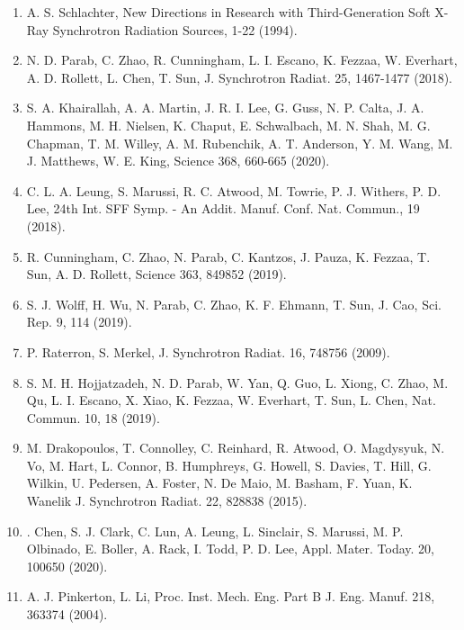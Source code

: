 \documentclass[10pt]{article}
\begin{document}
\begin{enumerate}
  \item A. S. Schlachter, New Directions in Research with Third-Generation Soft X-Ray Synchrotron Radiation Sources, 1-22 (1994).

  \item N. D. Parab, C. Zhao, R. Cunningham, L. I. Escano, K. Fezzaa, W. Everhart, A. D. Rollett, L. Chen, T. Sun, J. Synchrotron Radiat. 25, 1467-1477 (2018).

  \item S. A. Khairallah, A. A. Martin, J. R. I. Lee, G. Guss, N. P. Calta, J. A. Hammons, M. H. Nielsen, K. Chaput, E. Schwalbach, M. N. Shah, M. G. Chapman, T. M. Willey, A. M. Rubenchik, A. T. Anderson, Y. M. Wang, M. J. Matthews, W. E. King, Science 368, 660-665 (2020).

  \item C. L. A. Leung, S. Marussi, R. C. Atwood, M. Towrie, P. J. Withers, P. D. Lee, 24th Int. SFF Symp. - An Addit. Manuf. Conf. Nat. Commun., 19 (2018).

  \item R. Cunningham, C. Zhao, N. Parab, C. Kantzos, J. Pauza, K. Fezzaa, T. Sun, A. D. Rollett, Science 363, 849852 (2019).

  \item S. J. Wolff, H. Wu, N. Parab, C. Zhao, K. F. Ehmann, T. Sun, J. Cao, Sci. Rep. 9, 114 (2019).

  \item P. Raterron, S. Merkel, J. Synchrotron Radiat. 16, 748756 (2009).

  \item S. M. H. Hojjatzadeh, N. D. Parab, W. Yan, Q. Guo, L. Xiong, C. Zhao, M. Qu, L. I. Escano, X. Xiao, K. Fezzaa, W. Everhart, T. Sun, L. Chen, Nat. Commun. 10, 18 (2019).

  \item M. Drakopoulos, T. Connolley, C. Reinhard, R. Atwood, O. Magdysyuk, N. Vo, M. Hart, L. Connor, B. Humphreys, G. Howell, S. Davies, T. Hill, G. Wilkin, U. Pedersen, A. Foster, N. De Maio, M. Basham, F. Yuan, K. Wanelik J. Synchrotron Radiat. 22, 828838 (2015).

  \item . Chen, S. J. Clark, C. Lun, A. Leung, L. Sinclair, S. Marussi, M. P. Olbinado, E. Boller, A. Rack, I. Todd, P. D. Lee, Appl. Mater. Today. 20, 100650 (2020).

  \item A. J. Pinkerton, L. Li, Proc. Inst. Mech. Eng. Part B J. Eng. Manuf. 218, 363374 (2004).


\end{enumerate}
\end{document}
